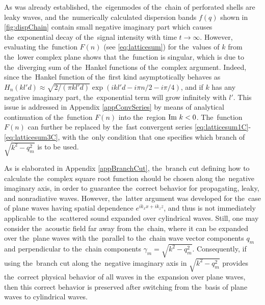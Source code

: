 As was already established, the~eigenmodes of the~chain of perforated shells are leaky waves, and the~numerically calculated dispersion bands $f(q)$ shown in \cref{fig:dispChain} contain small negative imaginary part which causes the~exponential decay of the~signal intensity with time $t \rightarrow \infty$.
However, evaluating the~function $F(n)$ (see \cref{eq:latticesum}) for the~values of $k$ from the~lower complex plane shows that the~function is singular, which is due to the~diverging sum of the~Hankel functions of the~complex argument.
Indeed, since the~Hankel function of the~first kind asymptotically behaves as $H_n(kl'd) \approx \sqrt{2/(\pi kl'd)} \exp(ikl'd - i\pi n/2 - i\pi/4)$, and if $k$ has any negative imaginary part, the~exponential term will grow infinitely with $l'$.
This issue is addressed in Appendix \ref{appConvSeries} by means of analytical continuation of the~function $F(n)$ into the~region $\textrm{Im } k < 0$.
The~function $F(n)$ can further be replaced by the~fast convergent series \cref{eq:latticesum1C}-\cref{eq:latticesum3C}, with the~only condition that one specifies which branch of $\sqrt{k^2-q_m^2}$ is to be used.


As is elaborated in Appendix \ref{appBranchCut}, the~branch cut defining how to calculate the~complex square root function should be chosen along the~negative imaginary axis, in order to guarantee the~correct behavior for propagating, leaky, and nonradiative waves.
However, the~latter argument was developed for the~case of plane waves having spatial dependence $e^{ik_xx+ik_zz}$, and thus is not immediately applicable to the~scattered sound expanded over cylindrical waves.
Still, one may consider the~acoustic field far away from the~chain, where it can be expanded over the~plane waves with the~parallel to the~chain wave vector components $q_m$ and perpendicular to the~chain components $\gamma_m = \sqrt{k^2-q_m^2}$.
Consequently, if using the~branch cut along the~negative imaginary axis in $\sqrt{k^2-q_m^2}$ provides the~correct physical behavior of all waves in the~expansion over plane waves, then this correct behavior is preserved after switching from the~basis of plane waves to cylindrical waves.

